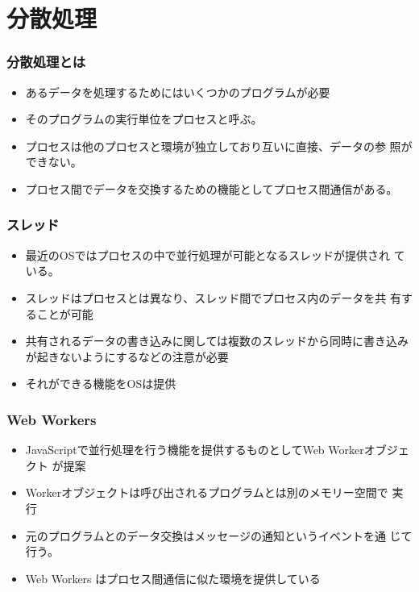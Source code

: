 \section{分散処理}
\begin{frame}[containsverbatim]
 \frametitle{分散処理とは}
 \begin{itemize}
  \item あるデータを処理するためにはいくつかのプログラムが必要
  \item そのプログラムの実行単位をプロセスと呼ぶ。
  \item プロセスは他のプロセスと環境が独立しており互いに直接、データの参
        照ができない。
  \item プロセス間でデータを交換するための機能としてプロセス間通信がある。
 \end{itemize}
\end{frame}
\begin{frame}[containsverbatim]
 \frametitle{スレッド}
 \begin{itemize}
  \item 最近のOSではプロセスの中で並行処理が可能となるスレッドが提供され
        ている。
  \item スレッドはプロセスとは異なり、スレッド間でプロセス内のデータを共
        有することが可能
  \item 共有されるデータの書き込みに関しては複数のスレッドから同時に書き込み
        が起きないようにするなどの注意が必要
  \item それができる機能をOSは提供
 \end{itemize}
\end{frame}
\begin{frame}[containsverbatim]
 \frametitle{Web Workers}
 \begin{itemize}
  \item JavaScriptで並行処理を行う機能を提供するものとしてWeb Workerオブジェクト
が提案
  \item Workerオブジェクトは呼び出されるプログラムとは別のメモリー空間で
        実行
  \item 元のプログラムとのデータ交換はメッセージの通知というイベントを通
        じて行う。
  \item Web Workers はプロセス間通信に似た環境を提供している
 \end{itemize}
\end{frame}
